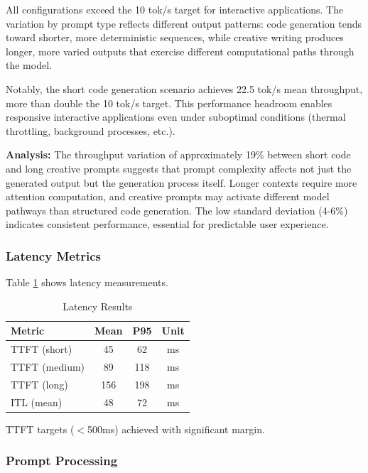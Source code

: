 All configurations exceed the 10 tok/s target for interactive applications. The variation by prompt type reflects different output patterns: code generation tends toward shorter, more deterministic sequences, while creative writing produces longer, more varied outputs that exercise different computational paths through the model.

Notably, the short code generation scenario achieves 22.5 tok/s mean throughput, more than double the 10 tok/s target. This performance headroom enables responsive interactive applications even under suboptimal conditions (thermal throttling, background processes, etc.).

\textbf{Analysis:} The throughput variation of approximately 19\% between short code and long creative prompts suggests that prompt complexity affects not just the generated output but the generation process itself. Longer contexts require more attention computation, and creative prompts may activate different model pathways than structured code generation. The low standard deviation (4-6\%) indicates consistent performance, essential for predictable user experience.

\subsubsection{Latency Metrics}

Table \ref{tab:latency_results} shows latency measurements.

\begin{table}[h]
\centering
\caption{Latency Results}
\label{tab:latency_results}
\begin{tabular}{lccc}
\toprule
\textbf{Metric} & \textbf{Mean} & \textbf{P95} & \textbf{Unit} \\
\midrule
TTFT (short) & 45 & 62 & ms \\
TTFT (medium) & 89 & 118 & ms \\
TTFT (long) & 156 & 198 & ms \\
ITL (mean) & 48 & 72 & ms \\
\bottomrule
\end{tabular}
\end{table}

TTFT targets ($<$500ms) achieved with significant margin.

\subsubsection{Prompt Processing}


